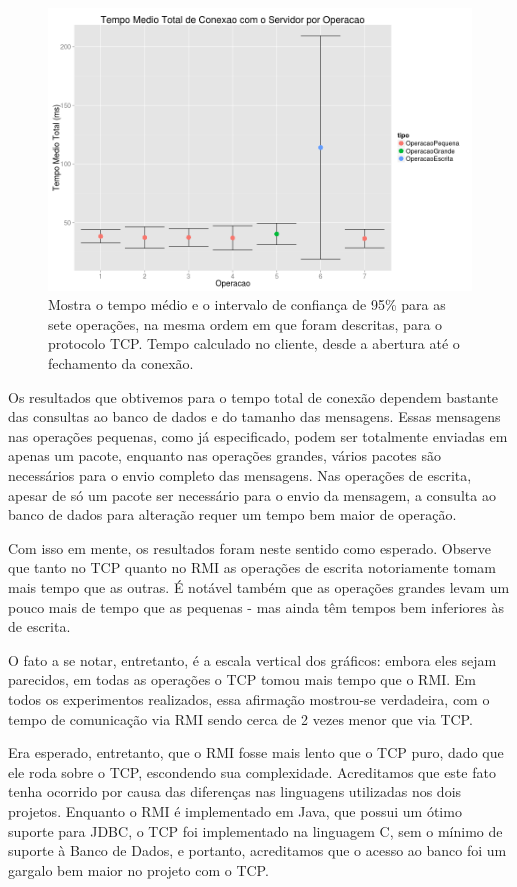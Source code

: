 \documentclass[12pt,a4paper]{article}
\begin{document}
\begin{figure}[h]
\centering
\includegraphics[width=\textwidth]{resultadosTempoTotalTCP.png}
\caption{Mostra o tempo médio e o intervalo de confiança de 95\% para as sete operações, na mesma ordem em que foram descritas, para o protocolo TCP. Tempo calculado no cliente, desde a abertura até o fechamento da conexão.}
\label{fig:totalT}
\end{figure}

Os resultados que obtivemos para o tempo total de conexão dependem bastante das consultas ao banco de dados e do tamanho das mensagens. Essas mensagens nas operações pequenas, como já especificado, podem ser totalmente enviadas em apenas um pacote, enquanto nas operações grandes, vários pacotes são necessários para o envio completo das mensagens. Nas operações de escrita, apesar de só um pacote ser necessário para o envio da mensagem, a consulta ao banco de dados para alteração requer um tempo bem maior de operação.

Com isso em mente, os resultados foram neste sentido como esperado. Observe que tanto no TCP quanto no RMI as operações de escrita notoriamente tomam mais tempo que as outras. É notável também que as operações grandes levam um pouco mais de tempo que as pequenas - mas ainda têm tempos bem inferiores às de escrita.

O fato a se notar, entretanto, é a escala vertical dos gráficos: embora eles sejam parecidos, em todas as operações o TCP tomou mais tempo que o RMI. Em todos os experimentos realizados, essa afirmação mostrou-se verdadeira, com o tempo de comunicação via RMI sendo cerca de 2 vezes menor que via TCP. 

Era esperado, entretanto, que o RMI fosse mais lento que o TCP puro, dado que ele roda sobre o TCP, escondendo sua complexidade. Acreditamos que este fato tenha ocorrido por causa das diferenças nas linguagens utilizadas nos dois projetos. Enquanto o RMI é implementado em Java, que possui um ótimo suporte para JDBC, o TCP foi implementado na linguagem C, sem o mínimo de suporte à Banco de Dados, e portanto, acreditamos que o acesso ao banco foi um gargalo bem maior no projeto com o TCP.
\end{document}
